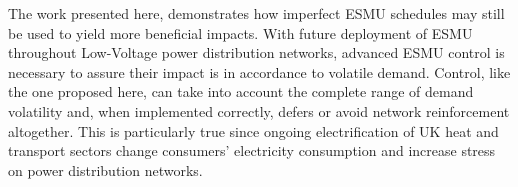 The work presented here, demonstrates how imperfect ESMU schedules may still be used to yield more beneficial impacts.
With future deployment of ESMU throughout Low-Voltage power distribution networks, advanced ESMU control is necessary to assure their impact is in accordance to volatile demand.
Control, like the one proposed here, can take into account the complete range of demand volatility and, when implemented correctly, defers or avoid network reinforcement altogether.
This is particularly true since ongoing electrification of UK heat and transport sectors change consumers' electricity consumption and increase stress on power distribution networks.